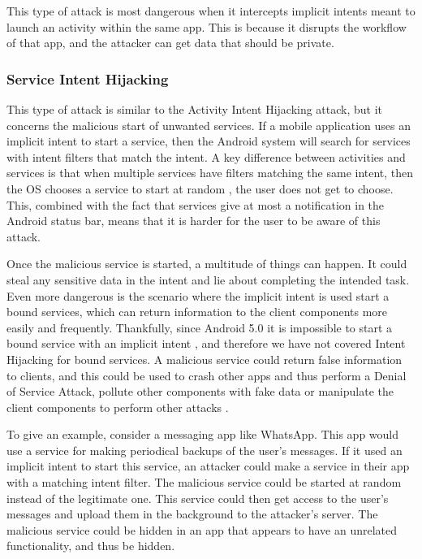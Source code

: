     This type of attack is most dangerous when it intercepts implicit intents meant to launch an activity within the same app. This is because it disrupts the workflow of that app, and the attacker can get data that should be private.
    
    \subsubsection{Service Intent Hijacking}
        \label{subsubsec:service_hijacking}
        
    This type of attack is similar to the Activity Intent Hijacking attack, but it concerns the malicious start of unwanted services. If a mobile application uses an implicit intent to start a service, then the Android system will search for services with intent filters that match the intent. A key difference between activities and services is that when multiple services have filters matching the same intent, then the OS chooses a service to start at random \cite{startService}, the user does not get to choose. This, combined with the fact that services give at most a notification in the Android status bar, means that it is harder for the user to be aware of this attack.
    
    Once the malicious service is started, a multitude of things can happen. It could steal any sensitive data in the intent and lie about completing the intended task. Even more dangerous is the scenario where the implicit intent is used start a bound services, which can return information to the client components more easily and frequently. Thankfully, since Android 5.0 it is impossible to start a bound service with an implicit intent \cite{bound_services}, and therefore we have not covered Intent Hijacking for bound services. A malicious service could return false information to clients, and this could be used to crash other apps and thus perform a Denial of Service Attack, pollute other components with fake data or manipulate the client components to perform other attacks \cite{2010_icc_paper}.
    
    To give an example, consider a messaging app like WhatsApp. This app would use a service for making periodical backups of the user’s messages. If it used an implicit intent to start this service, an attacker could make a service in their app with a matching intent filter. The malicious service could be started at random instead of the legitimate one. This service could then get access to the user’s messages and upload them in the background to the attacker’s server. The malicious service could be hidden in an app that appears to have an unrelated functionality, and thus be hidden.
    
